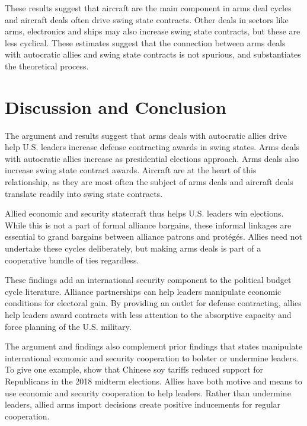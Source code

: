 \documentclass[12pt]{article}
\begin{document}
These results suggest that aircraft are the main component in arms deal cycles and aircraft deals often drive swing state contracts. 
Other deals in sectors like arms, electronics and ships may also increase swing state contracts, but these are less cyclical. 
These estimates suggest that the connection between arms deals with autocratic allies and swing state contracts is not spurious, and substantiates the theoretical process. 



\section{Discussion and Conclusion}


The argument and results suggest that arms deals with autocratic allies drive help U.S. leaders increase defense contracting awards in swing states. 
Arms deals with autocratic allies increase as presidential elections approach. 
Arms deals also increase swing state contract awards. 
Aircraft are at the heart of this relationship, as they are most often the subject of arms deals and aircraft deals translate readily into swing state contracts. 


Allied economic and security statecraft thus helps U.S. leaders win elections. 
While this is not a part of formal alliance bargains, these informal linkages are essential to grand bargains between alliance patrons and prot{\'e}g{\'e}s.
Allies need not undertake these cycles deliberately, but making arms deals is part of a cooperative bundle of ties regardless.


These findings add an international security component to the political budget cycle literature.
Alliance partnerships can help leaders manipulate economic conditions for electoral gain. 
By providing an outlet for defense contracting, allies help leaders award contracts with less attention to the absorptive capacity and force planning of the U.S. military.


The argument and findings also complement prior findings that states manipulate international economic and security cooperation to bolster or undermine leaders. 
To give one example, \citet{ChyzhUrbatsch2021} show that Chinese soy tariffs reduced support for Republicans in the 2018 midterm elections. 
Allies have both motive and means to use economic and security cooperation to help leaders. 
Rather than undermine leaders, allied arms import decisions create positive inducements for regular cooperation.
\end{document}
